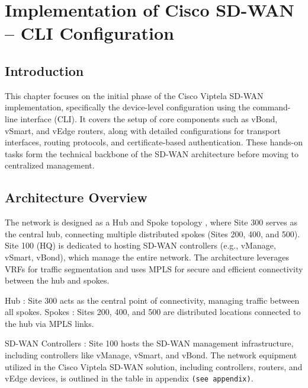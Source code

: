 \documentclass[12pt,english]{report}
\begin{document}
\chapter{Implementation of Cisco SD-WAN – CLI Configuration}
\section{Introduction}
This chapter focuses on the initial phase of the Cisco Viptela SD-WAN implementation, specifically the device-level configuration using the command-line interface (CLI). It covers the setup of core components such as vBond, vSmart, and vEdge routers, along with detailed configurations for transport interfaces, routing protocols, and certificate-based authentication. These hands-on tasks form the technical backbone of the SD-WAN architecture before moving to centralized management.

\section{Architecture Overview}
The network is designed as a Hub and Spoke topology , where Site 300 serves as the central hub, connecting multiple distributed spokes (Sites 200, 400, and 500). Site 100 (HQ) is dedicated to hosting SD-WAN controllers (e.g., vManage, vSmart, vBond), which manage the entire network. The architecture leverages VRFs for traffic segmentation and uses MPLS for secure and efficient connectivity between the hub and spokes.

Hub : Site 300 acts as the central point of connectivity, managing traffic between all spokes.
Spokes : Sites 200, 400, and 500 are distributed locations connected to the hub via MPLS links.

SD-WAN Controllers : Site 100 hosts the SD-WAN management infrastructure, including controllers like vManage, vSmart, and vBond.
The network equipment utilized in the Cisco Viptela SD-WAN solution, including controllers, routers, and vEdge devices, is outlined in the table in appendix \texttt{(see appendix)}.
\end{document}
